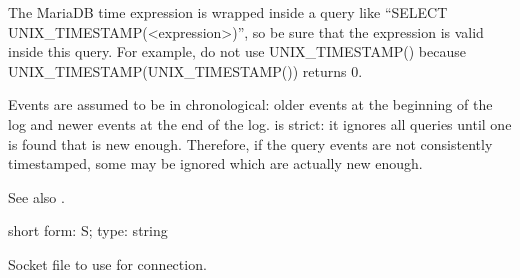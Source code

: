 \documentclass[letterpaper,10pt,english]{sphinxmanual}
\begin{document}
\begin{fulllineitems}
The MariaDB time expression is wrapped inside a query like
“SELECT UNIX\_TIMESTAMP(\textless{}expression\textgreater{})”, so be sure that the expression is
valid inside this query.  For example, do not use UNIX\_TIMESTAMP() because
UNIX\_TIMESTAMP(UNIX\_TIMESTAMP()) returns 0.

Events are assumed to be in chronological: older events at the beginning of
the log and newer events at the end of the log.  {\hyperref[\detokenize{mariadb-query-digest:cmdoption-mariadb-query-digest-since}]{}} is strict: it
ignores all queries until one is found that is new enough.  Therefore, if
the query events are not consistently timestamped, some may be ignored which
are actually new enough.

See also {\hyperref[\detokenize{mariadb-query-digest:cmdoption-mariadb-query-digest-until}]{}}.

\end{fulllineitems}


\begin{fulllineitems}
\label{\detokenize{mariadb-query-digest:cmdoption-mariadb-query-digest-socket}}
short form: \sphinxhyphen{}S; type: string

Socket file to use for connection.

\end{fulllineitems}

\end{document}
